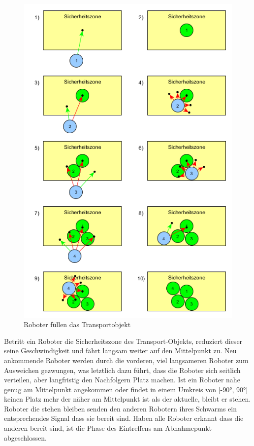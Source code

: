 \begin{figure}
	\includegraphics[width=\pictureWidth,keepaspectratio]{graphics/AlgorithmusAusweichenTransport.png}
	\caption{Roboter füllen das Transportobjekt}
	\label{pic:AlgorithmusAusweichenObjekt}
\end{figure}

Betritt ein Roboter die Sicherheitszone des Transport-Objekts, reduziert dieser seine Geschwindigkeit und fährt langsam weiter auf den Mittelpunkt zu. Neu ankommende Roboter werden durch die vorderen, viel langsameren Roboter zum Ausweichen gezwungen, was letztlich dazu führt, dass die Roboter sich seitlich verteilen, aber langfristig den Nachfolgern Platz machen. Ist ein Roboter nahe genug am Mittelpunkt angekommen oder findet in einem Umkreis von [-90°, 90°] keinen Platz mehr der näher am Mittelpunkt ist als der aktuelle, bleibt er stehen. Roboter die stehen bleiben senden den anderen Robotern ihres Schwarms ein entsprechendes Signal dass sie bereit sind. Haben alle Roboter erkannt dass die anderen bereit sind, ist die Phase des Eintreffens am Abnahmepunkt abgeschlossen.

